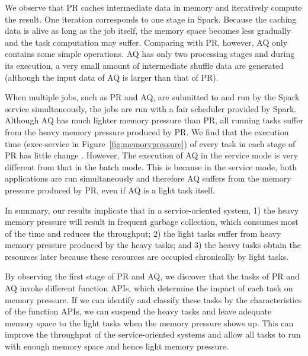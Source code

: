 We observe that PR caches intermediate data in memory and iteratively compute the result. One iteration corresponds to one stage in Spark. Because the caching data is alive as long as the job itself, the memory space becomes less gradually
and the task computation may suffer. 
Comparing with PR, however, AQ only contains some simple operations. AQ has only two processing stages and during its execution, a very small amount of intermediate shuffle data are generated (although the input data of AQ is larger than that of PR). 

When multiple jobs, such as PR and AQ, are submitted to and run by the Spark service simultaneously, the jobs are run with a fair scheduler provided by Spark. Although AQ has much lighter memory pressure than PR, all running tasks suffer from the heavy memory pressure produced by PR. We find that the execution time (exec-service in Figure~\ref{fig:memorypressure}) of every task in each stage of PR has little change
. However, The execution of AQ in the service mode is very different from that in the batch mode. This is because in the service mode, both applications are run simultaneously and therefore AQ suffers from the memory pressure produced by PR, even if AQ is a light task itself.

In summary, our results implicate that in a service-oriented system, 1) the heavy memory pressure will result in frequent garbage collection, which consumes most of the time and reduces the throughput; 2) the light tasks suffer from heavy memory pressure produced by the heavy tasks; and 3) the heavy tasks obtain the resources later because these resources are occupied chronically by light tasks.

By observing the first stage of PR and AQ, we discover that the tasks of PR and AQ invoke different function APIs, which determine the impact of each task on memory pressure. If we can identify and classify these tasks by the characteristics of the function APIs, we can suspend the heavy tasks and leave adequate memory space to the light tasks when the memory pressure shows up. This can improve the throughput of the service-oriented systems and allow all tasks to run with enough memory space and hence light memory pressure. 
  
